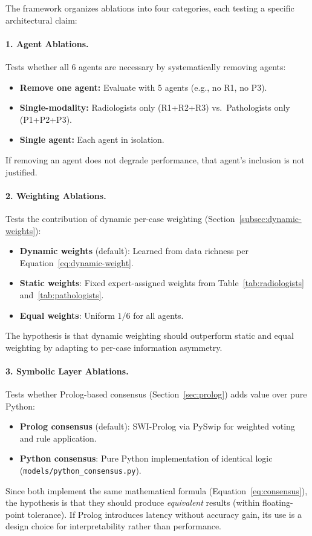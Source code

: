 \documentclass[12pt]{article}
\begin{document}
The framework organizes ablations into four categories, each testing a specific architectural claim:

\paragraph{1. Agent Ablations.}
Tests whether all 6 agents are necessary by systematically removing agents:
\begin{itemize}
    \item \textbf{Remove one agent:} Evaluate with 5 agents (e.g., no R1, no P3).
    \item \textbf{Single-modality:} Radiologists only (R1+R2+R3) vs.\ Pathologists only (P1+P2+P3).
    \item \textbf{Single agent:} Each agent in isolation.
\end{itemize}
If removing an agent does not degrade performance, that agent's inclusion is not justified.

\paragraph{2. Weighting Ablations.}
Tests the contribution of dynamic per-case weighting (Section~\ref{subsec:dynamic-weights}):
\begin{itemize}
    \item \textbf{Dynamic weights} (default): Learned from data richness per Equation~\ref{eq:dynamic-weight}.
    \item \textbf{Static weights}: Fixed expert-assigned weights from Table~\ref{tab:radiologists} and~\ref{tab:pathologists}.
    \item \textbf{Equal weights}: Uniform $1/6$ for all agents.
\end{itemize}
The hypothesis is that dynamic weighting should outperform static and equal weighting by adapting to per-case information asymmetry.

\paragraph{3. Symbolic Layer Ablations.}
Tests whether Prolog-based consensus (Section~\ref{sec:prolog}) adds value over pure Python:
\begin{itemize}
    \item \textbf{Prolog consensus} (default): SWI-Prolog via PySwip for weighted voting and rule application.
    \item \textbf{Python consensus}: Pure Python implementation of identical logic (\texttt{models/python\_consensus.py}).
\end{itemize}
Since both implement the same mathematical formula (Equation~\ref{eq:consensus}), the hypothesis is that they should produce \emph{equivalent} results (within floating-point tolerance). If Prolog introduces latency without accuracy gain, its use is a design choice for interpretability rather than performance.
\end{document}
